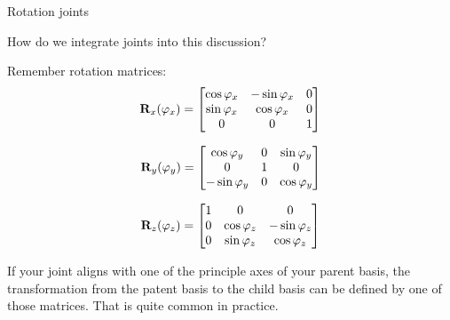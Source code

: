 \documentclass{beamer}
\begin{document}
\begin{frame}{Rotation joints}
	\begin{flushleft}
		
		How do we integrate joints into this discussion?
		
		\bigskip
		
		Remember rotation matrices:
		\begin{equation}
			\mathbf{R}_x (\varphi_x) = 
			\begin{bmatrix}
				\cos \varphi_x & -\sin \varphi_x & 0 \\
				\sin \varphi_x & \cos \varphi_x & 0 \\
				0 & 0 & 1
			\end{bmatrix}
		\end{equation}
	
	\begin{equation}
	\mathbf{R}_y (\varphi_y) = 
	\begin{bmatrix}
		\cos \varphi_y & 0 & \sin \varphi_y \\
		0 & 1 & 0 \\
		-\sin \varphi_y & 0 & \cos \varphi_y
	\end{bmatrix}
\end{equation}

\begin{equation}
	\mathbf{R}_z (\varphi_z) = 
	\begin{bmatrix}
		1 & 0 & 0 \\
		0 & \cos \varphi_z & -\sin \varphi_z \\
		0 & \sin \varphi_z & \cos \varphi_z 
	\end{bmatrix}
\end{equation}

If your joint aligns with one of the principle axes of your parent basis, the transformation from the patent basis to the child basis can be defined by one of those matrices. That is quite common in practice.
		
	\end{flushleft}
\end{frame}
\end{document}
